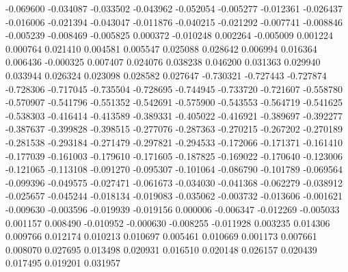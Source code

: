-0.069600
-0.034087
-0.033502
-0.043962
-0.052054
-0.005277
-0.012361
-0.026437
-0.016006
-0.021394
-0.043047
-0.011876
-0.040215
-0.021292
-0.007741
-0.008846
-0.005239
-0.008469
-0.005825
0.000372
-0.010248
0.002264
-0.005009
0.001224
0.000764
0.021410
0.004581
0.005547
0.025088
0.028642
0.006994
0.016364
0.006436
-0.000325
0.007407
0.024076
0.038238
0.046200
0.031363
0.029940
0.033944
0.026324
0.023098
0.028582
0.027647
-0.730321
-0.727443
-0.727874
-0.728306
-0.717045
-0.735504
-0.728695
-0.744945
-0.733720
-0.721607
-0.558780
-0.570907
-0.541796
-0.551352
-0.542691
-0.575900
-0.543553
-0.564719
-0.541625
-0.538303
-0.416414
-0.413589
-0.389331
-0.405022
-0.416921
-0.389697
-0.392277
-0.387637
-0.399828
-0.398515
-0.277076
-0.287363
-0.270215
-0.267202
-0.270189
-0.281538
-0.293184
-0.271479
-0.297821
-0.294533
-0.172066
-0.171371
-0.161410
-0.177039
-0.161003
-0.179610
-0.171605
-0.187825
-0.169022
-0.170640
-0.123006
-0.121065
-0.113108
-0.091270
-0.095307
-0.101064
-0.086790
-0.101789
-0.069564
-0.099396
-0.049575
-0.027471
-0.061673
-0.034030
-0.041368
-0.062279
-0.038912
-0.025657
-0.045244
-0.018134
-0.019083
-0.035062
-0.003732
-0.013606
-0.001621
-0.009630
-0.003596
-0.019939
-0.019156
0.000006
-0.006347
-0.012269
-0.005033
0.001157
0.008490
-0.010952
-0.000630
-0.008255
-0.011928
0.003235
0.014306
0.009766
0.012174
0.010213
0.010697
0.005461
0.010669
0.001173
0.007661
0.008070
0.027695
0.013498
0.020931
0.016510
0.020148
0.026157
0.020439
0.017495
0.019201
0.031957
